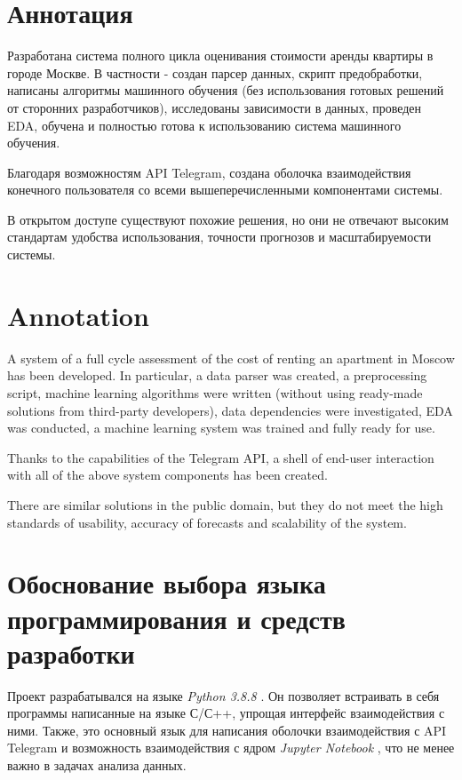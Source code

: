 \documentclass{article}
\begin{document}
	\newpage
	\thispagestyle{empty}

	\section* {Аннотация}
		\vspace{2ex}
		Разработана система полного цикла оценивания стоимости аренды квартиры в городе Москве. В частности - создан парсер данных, скрипт предобработки, написаны алгоритмы машинного обучения (без использования готовых решений от сторонних разработчиков), исследованы зависимости в данных, проведен EDA, обучена и полностью готова к использованию система машинного обучения.
		
		Благодаря возможностям API Telegram, создана оболочка взаимодействия конечного пользователя со всеми вышеперечисленными компонентами системы. 
		
		В открытом доступе существуют похожие решения, но они не отвечают высоким стандартам удобства использования, точности прогнозов и масштабируемости системы.
	\section* {Annotation}
		\vspace{2ex}
		A system of a full cycle assessment of the cost of renting an apartment in Moscow has been developed. In particular, a data parser was created, a preprocessing script, machine learning algorithms were written (without using ready-made solutions from third-party developers), data dependencies were investigated, EDA was conducted, a machine learning system was trained and fully ready for use.
		
		Thanks to the capabilities of the Telegram API, a shell of end-user interaction with all of the above system components has been created. 
		
		There are similar solutions in the public domain, but they do not meet the high standards of usability, accuracy of forecasts and scalability of the system.
		
	\newpage
	\thispagestyle{empty}
	\tableofcontents

	\newpage
	\setcounter{page}{4}
	\section {Обоснование выбора языка программирования и средств разработки}

		Проект разрабатывался на языке \textit{Python 3.8.8} \cite{litlink1}. Он позволяет встраивать в себя программы написанные на языке С/С++, упрощая интерфейс взаимодействия с ними. Также, это основный язык для написания оболочки взаимодействия с API Telegram и возможность взаимодействия с ядром \textit{Jupyter Notebook} \cite{litlink2}, что не менее важно в задачах анализа данных.
		
\end{document}
